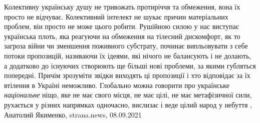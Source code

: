 Колективну українську душу не тривожать протиріччя та обмеження, вона їх просто
не відчуває. Колективний інтелект не шукає причин матеріальних проблем, він
просто не може цього робити. Рушійною силою у нас виступає українська плоть,
яка реагуючи на обмеження на тілесний дискомфорт, як то загроза війни чи
зменшення поживного субстрату, починає випльовувати з себе потоки пропозицій,
називаючи їх ідеями, які нічого не балансують і не долають, а додатково до
існуючих створюють ще більші нові проблеми, за якими губляться попередні.
Причім зрозуміти звідки виходять ці пропозиції і хто відповідає за їх втілення
в Україні неможливо.  Глобально можна говорити про українське \emph{національне} ніщо,
яке не має свого місця, не має цілі, не має метафізичної сили, рухається у
різних напрямках одночасно, вислизає і веде цілий народ у небуття
, Анатолий Якименко, strana.news, 08.09.2021

